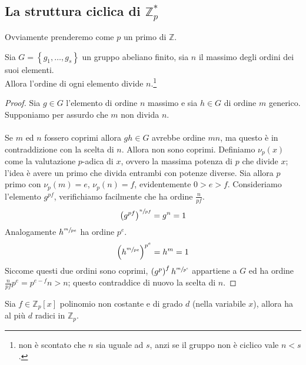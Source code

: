 \subsection{La struttura ciclica di $\mathbb{Z}^*_p$}
\label{lezione7}
Ovviamente prenderemo come $p$ un primo di $\mathbb{Z}$.
\begin{proposizione}
	Sia $G=\left\{g_1,\dots,g_s\right\}$ un gruppo abeliano finito, sia $n$ il massimo degli ordini dei suoi elementi. \\ Allora l'ordine di ogni elemento divide $n$.\footnote{non è scontato che $n$ sia uguale ad $s$, anzi se il gruppo non è ciclico vale $n<s$.}
\end{proposizione}
\begin{proof}
	Sia $g\in G$ l'elemento di ordine $n$ massimo e sia $h\in G$ di ordine $m$ generico. Supponiamo per assurdo che $m$ non divida $n$.\\ \\
	Se $m$ ed $n$ fossero coprimi allora $gh\in G$ avrebbe ordine $mn$, ma questo è in contraddizione con la scelta di $n$. Allora non sono coprimi. Definiamo $\nu_p(x)$ come la valutazione $p$-adica di $x$, ovvero la massima potenza di $p$ che divide $x$; l'idea è avere un primo che divida entrambi con potenze diverse. Sia allora $p$ primo con $\nu_p(m)=e$, $\nu_p(n)=f$, evidentemente $0>e>f$. Consideriamo l'elemento $g^{pf}$, verifichiamo facilmente che ha ordine $\frac{n}{pf}$. 
	\begin{equation*}
	\left(g^{pf}\right)^{\sfrac{n}{pf}}=g^n=1
	\end{equation*}
	Analogamente $h^{\sfrac{m}{pe}}$ ha ordine $p^e$.
	\begin{equation*}
	\left(h^{\sfrac{m}{pe}}\right)^{p^e}=h^m=1
	\end{equation*}
	Siccome questi due ordini sono coprimi, $\left(g^{p}\right)^fh^{\sfrac{m}{p^e}}$ appartiene a $G$ ed ha ordine $\frac{n}{pf}p^e=p^{e-f}n>n$; questo contraddice di nuovo la scelta di $n$.
\end{proof}
\begin{teorema}
	Sia $f\in\mathbb{Z}_p[x]$ polinomio non costante e di grado $d$ (nella variabile $x$), allora ha al più $d$ radici in $\mathbb{Z}_p$.
\end{teorema}
